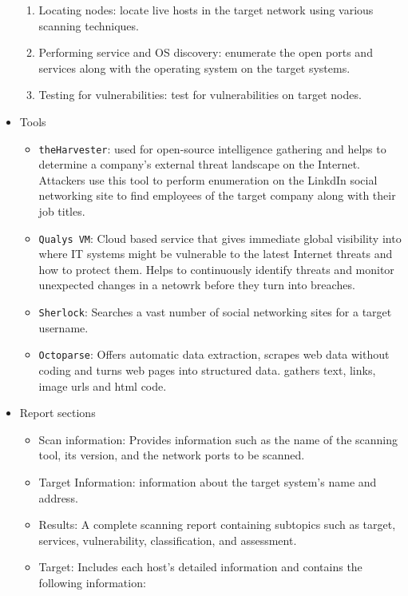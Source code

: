\begin{itemize}
    \begin{enumerate}
        \item Locating nodes: locate live hosts in the target network using various scanning techniques.
        \item Performing service and OS discovery: enumerate the open ports and services along with the operating system on the target systems.
        \item Testing for vulnerabilities: test for vulnerabilities on target nodes.
    \end{enumerate}
    \item Tools
    \begin{itemize}
        \item \verb|theHarvester|: used for open-source intelligence gathering and helps to determine a company's external threat landscape on the Internet. Attackers use this tool to perform enumeration on the LinkdIn social networking site to find employees of the target company along with their job titles.
        \item \verb|Qualys VM|: Cloud based service that gives immediate global visibility into where IT systems might be vulnerable to the latest Internet threats and how to protect them. Helps to continuously identify threats and monitor unexpected changes in a netowrk before they turn into breaches.
        \item \verb|Sherlock|: Searches a vast number of social networking sites for a target username.
        \item \verb|Octoparse|: Offers automatic data extraction, scrapes web data without coding and turns web pages into structured data. gathers text, links, image urls and html code. 
    \end{itemize}
    \item Report sections
    \begin{itemize}
        \item Scan information: Provides information such as the name of the scanning tool, its version, and the network ports to be scanned.
        \item Target Information: information about the target system's name and address.
        \item Results: A complete scanning report containing subtopics such as target, services, vulnerability, classification, and assessment.
        \item Target: Includes each host's detailed information and contains the following information:
        \begin{itemize}

\end{itemize}
\end{itemize}
\end{itemize}
